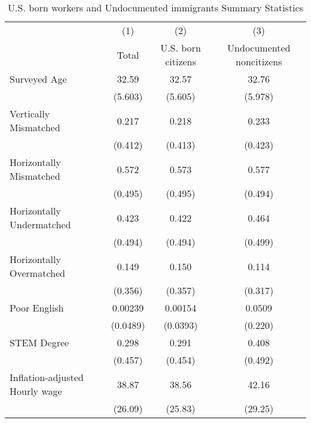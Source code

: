 \begin{table}[htbp]\centering
\def\sym#1{\ifmmode^{#1}\else\(^{#1}\)\fi}
\caption{U.S. born workers and Undocumented immigrants Summary Statistics \label{tab:sum}}
\begin{tabular}{l*{3}{c}}
\hline\hline
                    &\multicolumn{1}{c}{(1)}         &\multicolumn{1}{c}{(2)}         &\multicolumn{1}{c}{(3)}         \\
                    &       Total         &U.S. born citizens         &Undocumented noncitizens         \\
\hline
Surveyed Age        &       32.59         &       32.57         &       32.76         \\
                    &     (5.603)         &     (5.605)         &     (5.978)         \\
[1em]
Vertically Mismatched&       0.217         &       0.218         &       0.233         \\
                    &     (0.412)         &     (0.413)         &     (0.423)         \\
[1em]
Horizontally Mismatched&       0.572         &       0.573         &       0.577         \\
                    &     (0.495)         &     (0.495)         &     (0.494)         \\
[1em]
Horizontally Undermatched&       0.423         &       0.422         &       0.464         \\
                    &     (0.494)         &     (0.494)         &     (0.499)         \\
[1em]
Horizontally Overmatched&       0.149         &       0.150         &       0.114         \\
                    &     (0.356)         &     (0.357)         &     (0.317)         \\
[1em]
Poor English        &     0.00239         &     0.00154         &      0.0509         \\
                    &    (0.0489)         &    (0.0393)         &     (0.220)         \\
[1em]
STEM Degree         &       0.298         &       0.291         &       0.408         \\
                    &     (0.457)         &     (0.454)         &     (0.492)         \\
[1em]
Inflation-adjusted Hourly wage&       38.87         &       38.56         &       42.16         \\
                    &     (26.09)         &     (25.83)         &     (29.25)         \\

\end{tabular}
\end{table}
